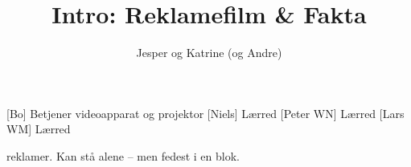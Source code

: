 \documentclass[danish]{article}
\title{Intro: Reklamefilm \& Fakta}
\author{Jesper og Katrine (og Andre)}
\begin{document}
\maketitle

\begin{roles}
  [Bo] Betjener videoapparat og projektor
  [Niels] Lærred
  [Peter WN] Lærred
  [Lars WM] Lærred
\end{roles}

\begin{sketch}

 reklamer. Kan stå alene -- men fedest i en blok.

\end{sketch}
\end{document}
